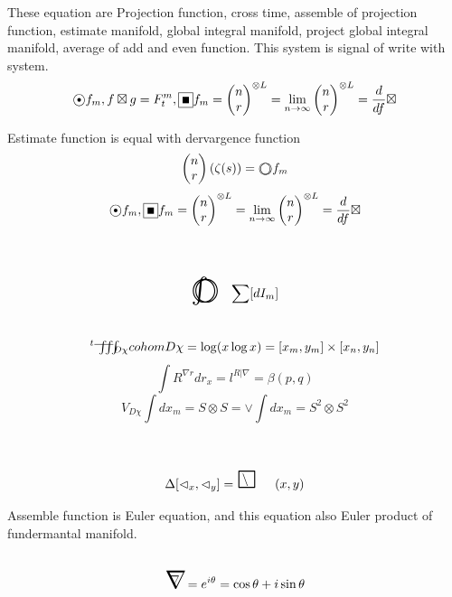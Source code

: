 \documentclass{jsarticle}
\begin{document}
 These equation are Projection function, cross time, assemble of projection
 function, estimate manifold, global integral manifold, project global 
 integral manifold, average of add and even function.
 This system is signal of write with system.
  $$ \whitewithblack f_m , f \boxtimes g = F^{m}_t, 
  \whitewithblacksquare f_m = {\begin{pmatrix}
	  n \\
  r \end{pmatrix}}^{\otimes L} = \lim_{n \to \infty}
  {\begin{pmatrix}
	  n \\
  r \end{pmatrix}}^{\otimes L} = {d \over {d f}}\boxtimes $$

  \newcommand{\whitewithwhitecircle}
  {\text{\textcircled{\phantom{\textbullet}}}}
  Estimate function is equal with dervargence function
  $$ \begin{pmatrix}
	  n \\
  r \end{pmatrix}(\zeta(s)) = \whitewithbodercircle f_m $$
  $$ \whitewithblack f_m ,
  \whitewithblacksquare f_m = {\begin{pmatrix}
	  n \\
  r \end{pmatrix}}^{\otimes L} = \lim_{n \to \infty}
  {\begin{pmatrix}
	  n \\
  r \end{pmatrix}}^{\otimes L} = {d \over {d f}}\boxtimes $$


 

$$ \whitewithbodercircleint \sum [dI_m] $$
$$ {}^t\variiint_{D\chi} cohom D\chi = \log(x\log x) = [x_m,y_m]\times
[x_n,y_n] $$
$$ \int R^{\nabla r}dr_x = l^{R|\nabla} = \beta(p,q) $$
$$ V_{D\chi}\int dx_m = S \otimes S = \vee\int dx_m = S^2 \otimes S^2 $$
$$ \Delta[\vartriangleleft_x,\vartriangleleft_y] = \average(x,y) $$

  \newcommand{\whitewithboder}{%
	  \begin{picture}(15,30)
		  \put(0,0){\scalebox{2.0}[2]{$\square$}}
		  \put(4,4){$\square$}
	  \end{picture}%
  } 
  \newcommand{\whitewithnabla}{%
	  \begin{picture}(15,30)
		  \put(0,0){\scalebox{2.0}[2]{$\nabla$}}
		  \put(3,3){$\nabla$}
	  \end{picture}%
  } 


  Assemble function is Euler equation, and this equation also
  Euler product of fundermantal manifold.
  $$ \whitewithnabla = e^{i\theta} = \cos \theta + i \sin \theta $$
\end{document}
